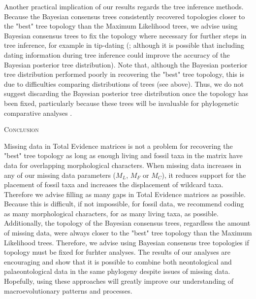\documentclass[12pt,letterpaper]{article}
\renewcommand{\section}[1]{%
\bigskip
\begin{center}
\begin{Large}
\normalfont\scshape #1
\medskip
\end{Large}
\end{center}}
\begin{document}
Another practical implication of our results regards the tree inference methods. Because the Bayesian consensus trees consistently recovered topologies closer to the "best" tree topology than the Maximum Likelihood trees, we advise using Bayesian consensus trees to fix the topology where necessary for further steps in tree inference, for example in tip-dating (\citealp{ronquista2012,BEASTmaster};
although it is possible that including dating information during tree inference could improve the accuracy of the Bayesian posterior tree distribution). Note that, although the Bayesian posterior tree distribution performed poorly in recovering the "best" tree topology, this is due to difficulties comparing distributions of trees (see above). Thus, we do not suggest discarding the Bayesian posterior tree distribution once the topology has been fixed, particularly because these trees will be invaluable for phylogenetic comparative analyses \citep[e.g.][]{jetzthe2012}.

%
%

\section{Conclusion}

Missing data in Total Evidence matrices is not a problem for recovering the "best" tree topology as long as enough living and fossil taxa in the matrix have data for overlapping morphological characters. When missing data increases in any of our missing data parameters ($M_{L}$, $M_{F}$ or $M_{C}$), it reduces support for the placement of fossil taxa and increases the displacement of wildcard taxa. Therefore we advise filling as many gaps in Total Evidence matrices as possible. Because this is difficult, if not impossible, for fossil data, we recommend coding as many morphological characters, for as many living taxa, as possible. Additionally, the topology of the Bayesian consensus trees, regardless the amount of missing data, were always closer to the "best" tree topology than the Maximum Likelihood trees. Therefore, we advise using Bayesian consensus tree topologies if topology must be fixed for furhter analyses. The results of our analyses are encouraging and show that it is possible to combine both neontological and palaeontological data in the same phylogeny despite issues of missing data. Hopefully, using these approaches will greatly improve our understanding of macroevolutionary patterns and processes.
\end{document}

